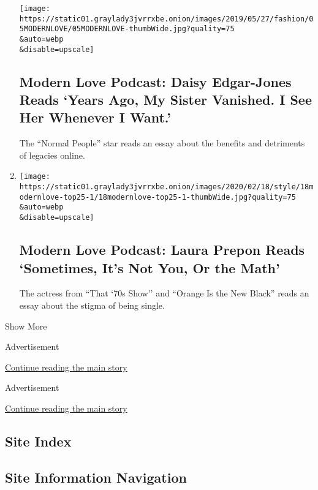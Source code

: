 \begin{enumerate}
  \texttt{[image: https://static01.graylady3jvrrxbe.onion/images/2019/05/27/fashion/05MODERNLOVE/05MODERNLOVE-thumbWide.jpg?quality=75\\\&auto=webp\\\&disable=upscale]}

  \hypertarget{modern-love-podcast-daisy-edgar-jones-reads-years-ago-my-sister-vanished-i-see-her-whenever-i-want}{%
  \subsection{Modern Love Podcast: Daisy Edgar-Jones Reads `Years Ago,
  My Sister Vanished. I See Her Whenever I
  Want.'}\label{modern-love-podcast-daisy-edgar-jones-reads-years-ago-my-sister-vanished-i-see-her-whenever-i-want}}

  The ``Normal People'' star reads an essay about the benefits and
  detriments of legacies online.
\item
  \href{/2020/04/22/style/modern-love-podcast-laura-prepon.html}{}

  \texttt{[image: https://static01.graylady3jvrrxbe.onion/images/2020/02/18/style/18modernlove-top25-1/18modernlove-top25-1-thumbWide.jpg?quality=75\\\&auto=webp\\\&disable=upscale]}

  \hypertarget{modern-love-podcast-laura-prepon-reads-sometimes-its-not-you-or-the-math}{%
  \subsection{Modern Love Podcast: Laura Prepon Reads `Sometimes, It's
  Not You, Or the
  Math'}\label{modern-love-podcast-laura-prepon-reads-sometimes-its-not-you-or-the-math}}

  The actress from ``That `70s Show'' and ``Orange Is the New Black''
  reads an essay about the stigma of being single.
\end{enumerate}

Show More

Advertisement

\protect\hyperlink{after-mid1}{Continue reading the main story}

Advertisement

\protect\hyperlink{after-mktg}{Continue reading the main story}

\hypertarget{site-index}{%
\subsection{Site Index}\label{site-index}}

\hypertarget{site-information-navigation}{%
\subsection{Site Information
Navigation}\label{site-information-navigation}}

